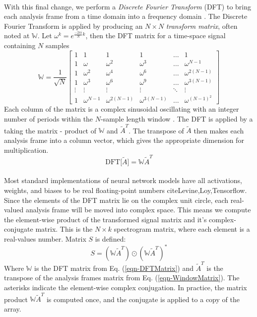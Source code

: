\documentclass[12pt,letterpaper]{article}
\begin{document}
\paragraph*{}With this final change, we perform a \textit{Discrete Fourier Transform} (DFT) to bring each analysis frame from a time domain into a frequency domain \cite{Olson,Peatross,Virtanen}. The Discrete Fourier Transform is applied by producing an $N \times N$ \textit{transform matrix}, often noted at $\mathbb{W}$. Let $\omega^k = e^{\frac{-2\pi i}{N}k}$, then the DFT matrix for a time-space signal containing $N$ samples
\begin{equation}
\label{eqn-DFTMatrix}
\mathbb{W} = \frac{1}{\sqrt{N}}
\begin{bmatrix}
1 & 1 & 1 & 1 & \hdots & 1 \\
1 & \omega		& \omega^2 & \omega^3 & \hdots & \omega^{N-1} \\
1 & \omega^2	& \omega^4 & \omega^6 & \hdots & \omega^{2(N-1)} \\
1 & \omega^3	& \omega^6 & \omega^9 & \hdots & \omega^{3(N-1)} \\
\vdots & \vdots & \vdots & \vdots & \ddots & \vdots \\
1 & \omega^{N-1} & \omega^{2(N-1)} & \omega^{3(N-1)} & \hdots & \omega^{(N-1)^2}
\end{bmatrix}
\end{equation}
Each column of the matrix is a complex sinusoidal oscillating with an integer number of periods within the $N$-sample length window \cite{Short,Peatross}. The DFT is applied by a taking the matrix - product of $\mathbb{W}$ and $\widetilde{A}^T$. The transpose of $\widetilde{A}$ then makes each analysis frame into a column vector, which gives the appropriate dimension for multiplication.
\begin{equation}
\label{eqn-DFT}
\text{DFT}\big[ \widetilde{A} \big] = \mathbb{W}\widetilde{A}^T
\end{equation}

\paragraph*{}Most standard implementations of neural network models have all activations, weights, and biases to be real floating-point numbers cite{Levine,Loy,Tensorflow}. Since the elements of the DFT matrix lie on the complex unit circle, each real-valued analysis frame will be moved into complex space. This means we compute the element-wise product of the transformed signal matrix and it's complex-conjugate matrix. This is the $N \times k$
spectrogram matrix, where each element is a real-values number. Matrix $S$ is defined:
\begin{equation}
\label{eqn-Spectrogram}
S = (\mathbb{W}\widetilde{A}^T) \odot (\mathbb{W}\widetilde{A}^T)^*
\end{equation}
Where $\mathbb{W}$ is the DFT matrix from Eq. (\ref{eqn-DFTMatrix}) and $\widetilde{A}^T$ is the transpose of the analysis frames matrix from Eq. (\ref{eqn-WindowMatrix}). The asterisks indicate the element-wise complex conjugation. In practice, the matrix product $\mathbb{W}\widetilde{A}^T$ is computed once, and the conjugate is applied to a copy of the array.
\end{document}
